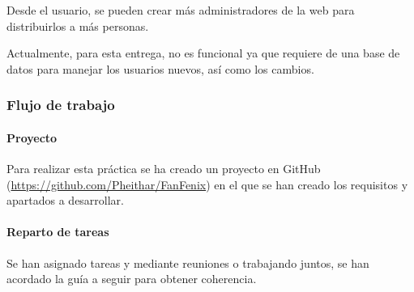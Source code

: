\documentclass[10pt, spanish, pdftex]{template/UC3M_document}
\begin{document}
Desde el usuario, se pueden crear más administradores de la web para distribuirlos a más personas.

Actualmente, para esta entrega, no es funcional ya que requiere de una base de datos para manejar los usuarios nuevos, así como los cambios.




\subsubsection{Flujo de trabajo}
\paragraph{Proyecto}


Para realizar esta práctica se ha creado un proyecto en GitHub (\url{https://github.com/Pheithar/FanFenix}) en el que se han creado los requisitos y apartados a desarrollar.
\paragraph{Reparto de tareas}


Se han asignado tareas y mediante reuniones o trabajando juntos, se han acordado la guía a seguir para obtener coherencia.
\end{document}
